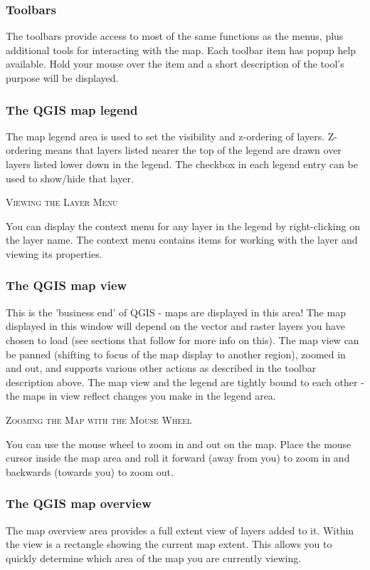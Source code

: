 \documentclass[10pt,english]{article}
\newcommand\qgistip[1]{\raggedright\small{#1}}
\begin{document}
\begin{onehalfspace}
\subsubsection{Toolbars}
The toolbars provide access to most of the same functions as the menus, plus
additional tools for interacting with the map. Each toolbar item has popup
help available. Hold your mouse over the item and a short description of the
tool's purpose will be displayed. %

\subsubsection{The QGIS map legend}
The map legend area is used to set the visibility and z-ordering of layers.
Z-ordering means that layers listed nearer the top of the legend are drawn
over layers listed lower down in the legend. The checkbox in each legend entry
can be used to show/hide that layer.
\begin{Tip} \caption{\textsc{Viewing the Layer Menu}}
\qgistip{You can display the context menu for any layer in the legend by right-clicking
on the layer name. The context menu contains items for working with the layer and viewing
its properties.}
\end{Tip}

\subsubsection{The QGIS map view}

This is the 'business end' of QGIS - maps are displayed in this area! The map
displayed in this window will depend on the vector and raster layers you have
chosen to load (see sections that follow for more info on this). The map view
can be panned (shifting to focus of the map display to another region), zoomed
in and out, and supports various other actions as described in the toolbar
description above.  The map view and the legend are tightly bound to each
other - the maps in view reflect changes you make in the legend area.  
\begin{Tip}\caption{\textsc{Zooming the Map with the Mouse Wheel}}
\qgistip{You can use the mouse wheel to zoom in and out on the map. Place the mouse cursor inside the map area and roll it forward (away from you) to zoom in and backwards (towards you) to zoom out.
}
\end{Tip}
\subsubsection{The QGIS map overview}
The map overview area provides a full extent view of layers added to it. Within the view is a rectangle showing the current map extent. This allows you to quickly determine which area of the map you are currently viewing.


\end{onehalfspace}
\end{document}
